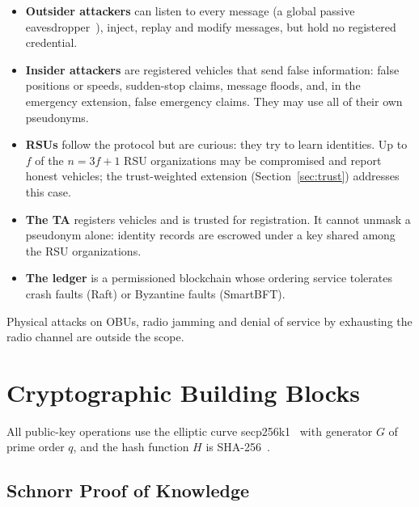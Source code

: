 \begin{itemize}
  \item \textbf{Outsider attackers} can listen to every message (a global passive eavesdropper~\cite{gruteser2005tracking}),
  inject, replay and modify messages, but hold no registered credential.
  \item \textbf{Insider attackers} are registered vehicles that send false information: false
  positions or speeds, sudden-stop claims, message floods, and, in the emergency extension, false
  emergency claims. They may use all of their own pseudonyms.
  \item \textbf{RSUs} follow the protocol but are curious: they try to learn identities. Up to $f$ of
  the $n = 3f+1$ RSU organizations may be compromised and report honest vehicles; the trust-weighted
  extension (Section~\ref{sec:trust}) addresses this case.
  \item \textbf{The TA} registers vehicles and is trusted for registration. It cannot unmask a
  pseudonym alone: identity records are escrowed under a key shared among the RSU organizations.
  \item \textbf{The ledger} is a permissioned blockchain whose ordering service tolerates crash
  faults (Raft) or Byzantine faults (SmartBFT).
\end{itemize}
Physical attacks on OBUs, radio jamming and denial of service by exhausting the radio channel are
outside the scope.

\section{Cryptographic Building Blocks}

All public-key operations use the elliptic curve secp256k1~\cite{sec2} with generator $G$ of prime
order $q$, and the hash function $H$ is SHA-256~\cite{fips1804}.

\subsection{Schnorr Proof of Knowledge}

